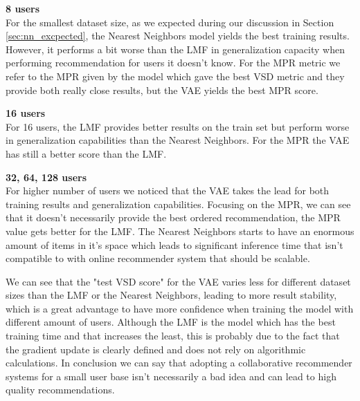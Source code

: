 \textbf{8 users} \\
For the smallest dataset size, as we expected during our discussion in Section \ref{sec:nn_excpected}, the Nearest Neighbors model yields the best training results. However, it performs a bit worse than the LMF in generalization capacity when performing recommendation for users it doesn't know. For the MPR metric we refer to the MPR given by the model which gave the best VSD metric and they provide both really close results, but the VAE yields the best MPR score.

\textbf{16 users} \\
For 16 users, the LMF provides better results on the train set but perform worse in generalization capabilities than the Nearest Neighbors. For the MPR the VAE  has still a better score than the LMF.

\textbf{32, 64, 128 users} \\
For higher number of users we noticed that the VAE takes the lead for both training results and generalization capabilities. Focusing on the MPR, we can see that it doesn't necessarily provide the best ordered recommendation, the MPR value gets better for the LMF. The Nearest Neighbors starts to have an enormous amount of items in it's space which leads to significant inference time that isn't compatible to with online recommender system that should be scalable.

We can see that the "test VSD score" for the VAE varies less for different dataset sizes than the LMF or the Nearest Neighbors, leading to more result stability, which is a great advantage to have more confidence when training the model with different amount of users. Although the LMF is the model which has the best training time and that increases the least, this is probably due to the fact that the gradient update is clearly defined and does not rely on algorithmic calculations. In conclusion we can say that adopting a collaborative recommender systems for a small user base isn't necessarily a bad idea and can lead to high quality recommendations.
